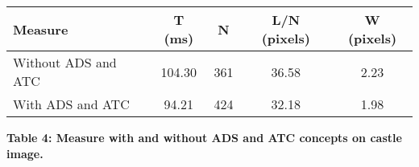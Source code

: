 \begin{longtable}[]{@{}lcccc@{}}
\toprule
Measure & T (ms) & N & L/N (pixels) & W (pixels)\tabularnewline
\midrule
\endhead
Without ADS and ATC & 104.30 & 361 & 36.58 & 2.23\tabularnewline
With ADS and ATC & 94.21 & 424 & 32.18 & 1.98\tabularnewline
\bottomrule
\end{longtable}

\textbf{Table 4: Measure with and without ADS and ATC concepts on castle
image.}
